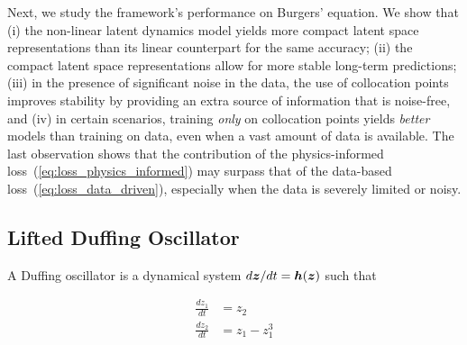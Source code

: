 Next, we study the framework's performance on Burgers' equation. We show that (i) the non-linear latent dynamics model yields more compact latent space representations than its linear counterpart for the same accuracy; (ii) the compact latent space representations allow for more stable long-term predictions; (iii) in the presence of significant noise in the data, the use of collocation points improves stability by providing an extra source of information that is noise-free, and (iv) in certain scenarios, training \textit{only} on collocation points yields \textit{better} models than training on data, even when a vast amount of data is available. The last observation shows that the contribution of the physics-informed loss~(\ref{eq:loss_physics_informed}) may surpass that of the data-based loss~(\ref{eq:loss_data_driven}), especially when the data is severely limited or noisy. 



\subsection{Lifted Duffing Oscillator}
\label{sec:duffing}

A Duffing oscillator is a dynamical system $d\boldsymbol{z}/dt = \boldsymbol{h}(\boldsymbol{z})$ such that 

\begin{equation}
    \label{eq:duffing_definition}
    \begin{split}
    \frac{dz_1}{dt} & = z_2 \\ 
    \frac{dz_2}{dt} & = z_1 - z_1^3
    \end{split}
\end{equation}

